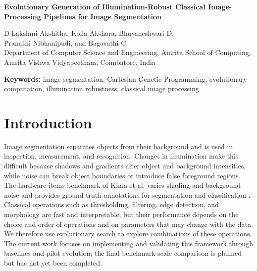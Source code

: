\documentclass[11pt,a4paper]{article}
\begin{document}
\begin{center}
    {\LARGE\textbf{Evolutionary Generation of Illumination-Robust Classical Image-Processing Pipelines for Image Segmentation}\par}
    \vspace{0.7em}
    D Lakshmi Akshitha, Kolla Akshara, Bhuvaneshwari D,\\
    Pranathi Nibhanipudi, and Bagavathi C\\[0.4em]
    {\small Department of Computer Science and Engineering, Amrita School of Computing,\\
    Amrita Vishwa Vidyapeetham, Coimbatore, India}
\end{center}

\begin{abstract}
Illumination and noise changes can make a fixed image-segmentation pipeline unreliable. In this project, we use Kartezio, a framework that evolves interpretable computer-vision algorithms with Cartesian Genetic Programming, to design segmentation pipelines for hardware-item images captured under varying conditions. The evolved pipelines combine conventional operations such as thresholding, filtering, edge detection, and morphology. We evaluate segmentation quality and robustness using Dice, IoU, object-count error, $Q_{\mathrm{seg}}$, and the segmentation-only robustness measure $R_{\mathrm{seg}}$. Otsu and Sobel methods are used as fixed reference baselines, and scene-held-out evaluation is planned for the final experiments. The current implementation covers benchmark validation, baseline evaluation, synthetic pilot evolution, and pipeline export. Classification is outside the scope of this study, so the work does not claim to reproduce the complete evaluation protocol of the original benchmark paper.
\end{abstract}

\textbf{Keywords:} image segmentation, Cartesian Genetic Programming, evolutionary computation, illumination robustness, classical image processing.

\section{Introduction}

Image segmentation separates objects from their background and is used in inspection, measurement, and recognition. Changes in illumination make this difficult because shadows and gradients alter object and background intensities, while noise can break object boundaries or introduce false foreground regions. The hardware-items benchmark of Khan et al. varies shading and background noise and provides ground-truth annotations for segmentation and classification \cite{khan2015}. Classical operations such as thresholding, filtering, edge detection, and morphology are fast and interpretable, but their performance depends on the choice and order of operations and on parameters that may change with the data. We therefore use evolutionary search to explore combinations of these operations. The current work focuses on implementing and validating this framework through baselines and pilot evolution; the final benchmark-scale comparison is planned but has not yet been completed.
\end{document}

